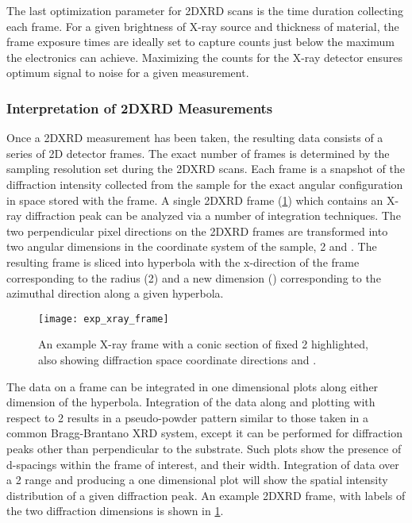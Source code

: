 The last optimization parameter for 2DXRD scans is the time duration collecting each frame.
For a given brightness of X-ray source and thickness of material, the frame exposure times are ideally set to capture counts just below the maximum the electronics can achieve.
Maximizing the counts for the X-ray detector ensures optimum signal to noise for a given measurement.

\subsubsection{Interpretation of 2DXRD Measurements} Once a 2DXRD measurement has been taken, the resulting data consists of a series of 2D detector frames.
The exact number of frames is determined by the sampling resolution set during the 2DXRD scans.
Each frame is a snapshot of the diffraction intensity collected from the sample for the exact angular configuration in space stored with the frame.
A single 2DXRD frame (\cref{fig:exp_xray_frame}) which contains an X-ray diffraction peak can be analyzed via a number of integration techniques.
The two perpendicular pixel directions on the 2DXRD frames are transformed into two angular dimensions in the coordinate system of the sample, 2\straighttheta{} and \textchi{} \cite{He2009}.
The resulting frame is sliced into hyperbola with the x-direction of the frame corresponding to the radius (2\straighttheta{}) and a new dimension (\textchi{}) corresponding to the azimuthal direction along a given hyperbola.
\begin{figure}
 \centering \texttt{[image: exp\_xray\_frame]}
 \caption[Example 2DXRD frame]{\label{fig:exp_xray_frame}An example X-ray frame with a conic section of fixed 2\straighttheta{} highlighted, also showing diffraction space coordinate directions \straighttheta{} and \textchi{}.}
\end{figure}

The data on a frame can be integrated in one dimensional plots along either dimension of the hyperbola.
Integration of the data along \textchi{} and plotting with respect to 2\straighttheta{} results in a pseudo-powder pattern similar to those taken in a common Bragg-Brantano XRD system, except it can be performed for diffraction peaks other than perpendicular to the substrate.
Such plots show the presence of d-spacings within the frame of interest, and their width.
Integration of data over a 2\straighttheta{} range and producing a one dimensional plot will show the spatial intensity distribution of a given diffraction peak.
An example 2DXRD frame, with labels of the two diffraction dimensions is shown in \cref{fig:exp_xray_frame}.

